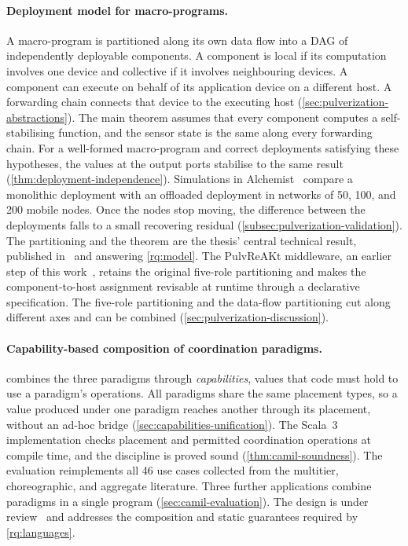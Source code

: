 \paragraph{Deployment model for macro-programs.}
A macro-program is partitioned along its own data flow into a \ac{DAG} of independently deployable components.
%
A component is local if its computation involves one device and collective if it involves neighbouring devices.
%
A component can execute on behalf of its application device on a different host.
A forwarding chain connects that device to the executing host (\cref{sec:pulverization-abstractions}).
%
The main theorem assumes that
every component computes a self-stabilising function,
and the sensor state is the same along every forwarding chain.
%
For a well-formed macro-program and correct deployments satisfying these hypotheses,
the values at the output ports stabilise to the same result (\cref{thm:deployment-independence}).
%
Simulations in Alchemist~\cite{DBLP:journals/jos/PianiniMV13} compare a monolithic deployment with an offloaded deployment
in networks of 50, 100, and 200 mobile nodes.
%
Once the nodes stop moving, the difference between the deployments falls to a small recovering residual (\cref{subsec:pulverization-validation}).
%
The partitioning and the theorem are the thesis' central technical result,
published in~\cite{DBLP:conf/acsos/FarabegoliVC24} and answering \cref{rq:model}.
%
The PulvReAKt middleware, an earlier step of this work~\cite{DBLP:journals/fgcs/FarabegoliPCV24},
retains the original five-role partitioning
and makes the component-to-host assignment revisable at runtime through a declarative specification.
%
The five-role partitioning and the data-flow partitioning cut along different axes and can be combined (\cref{sec:pulverization-discussion}).

\paragraph{Capability-based composition of coordination paradigms.}
\camil combines the three paradigms through \emph{capabilities},
values that code must hold to use a paradigm's operations.
%
All paradigms share the same placement types,
so a value produced under one paradigm reaches another through its placement,
without an ad-hoc bridge (\cref{sec:capabilities-unification}).
%
The Scala~3 implementation checks placement and permitted coordination operations at compile time,
and the discipline is proved sound (\cref{thm:camil-soundness}).
%
The evaluation reimplements all 46 use cases collected from the multitier, choreographic, and aggregate literature.
%
Three further applications combine paradigms in a single program (\cref{sec:camil-evaluation}).
%
The design is under review~\cite{Farabegoli:2026:CaMiL}
and addresses the composition and static guarantees required by \cref{rq:languages}.

